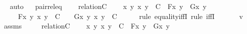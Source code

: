 \begin{isabellebody}
\isadelimproof
\ %
\endisadelimproof
%
\isatagproof
{}\isamarkupfalse%
\ auto%
\endisatagproof
{\isafoldproof}%
%
\isadelimproof
%
\endisadelimproof
\ \isanewline
\isanewline
{}\isamarkupfalse%
\ pair{\isacharunderscore}{\kern0pt}rel{\isacharunderscore}{\kern0pt}eq\ {\isacharcolon}{\kern0pt}\ \isanewline
\ \ {\isachardoublequoteopen}relation{\isacharparenleft}{\kern0pt}C{\isacharparenright}{\kern0pt}\isanewline
\ \ \ {\isasymLongrightarrow}\ {\isacharparenleft}{\kern0pt}{\isasymforall}x{\isachardot}{\kern0pt}\ {\isasymforall}y{\isachardot}{\kern0pt}\ {\isacharless}{\kern0pt}x{\isacharcomma}{\kern0pt}\ y{\isachargreater}{\kern0pt}\ {\isasymin}\ C\ {\isasymlongrightarrow}\ F{\isacharparenleft}{\kern0pt}x{\isacharcomma}{\kern0pt}\ y{\isacharparenright}{\kern0pt}\ {\isacharequal}{\kern0pt}\ G{\isacharparenleft}{\kern0pt}x{\isacharcomma}{\kern0pt}\ y{\isacharparenright}{\kern0pt}{\isacharparenright}{\kern0pt}\ \isanewline
\ \ \ {\isasymLongrightarrow}\ {\isacharbraceleft}{\kern0pt}\ F{\isacharparenleft}{\kern0pt}x{\isacharcomma}{\kern0pt}\ y{\isacharparenright}{\kern0pt}{\isachardot}{\kern0pt}\ {\isacharless}{\kern0pt}x{\isacharcomma}{\kern0pt}\ y{\isachargreater}{\kern0pt}\ {\isasymin}\ C\ {\isacharbraceright}{\kern0pt}\ {\isacharequal}{\kern0pt}\ {\isacharbraceleft}{\kern0pt}\ G{\isacharparenleft}{\kern0pt}x{\isacharcomma}{\kern0pt}\ y{\isacharparenright}{\kern0pt}{\isachardot}{\kern0pt}\ {\isacharless}{\kern0pt}x{\isacharcomma}{\kern0pt}\ y{\isachargreater}{\kern0pt}\ {\isasymin}\ C\ {\isacharbraceright}{\kern0pt}{\isachardoublequoteclose}\ \isanewline
%
\isadelimproof
\ \ %
\endisadelimproof
%
\isatagproof
{}\isamarkupfalse%
\ {\isacharparenleft}{\kern0pt}rule\ equality{\isacharunderscore}{\kern0pt}iffI{\isacharsemicolon}{\kern0pt}\ rule\ iffI{\isacharparenright}{\kern0pt}\isanewline
{}\isamarkupfalse%
\ {\isacharminus}{\kern0pt}\ \isanewline
\ \ \isamarkupfalse%
\ v\ \isamarkupfalse%
\ assms\ {\isacharcolon}{\kern0pt}\isanewline
\ \ \ \ {\isachardoublequoteopen}relation{\isacharparenleft}{\kern0pt}C{\isacharparenright}{\kern0pt}{\isachardoublequoteclose}\isanewline
\ \ \ \ {\isachardoublequoteopen}{\isasymforall}x{\isachardot}{\kern0pt}\ {\isasymforall}y{\isachardot}{\kern0pt}\ {\isacharless}{\kern0pt}x{\isacharcomma}{\kern0pt}\ y{\isachargreater}{\kern0pt}\ {\isasymin}\ C\ {\isasymlongrightarrow}\ F{\isacharparenleft}{\kern0pt}x{\isacharcomma}{\kern0pt}\ y{\isacharparenright}{\kern0pt}\ {\isacharequal}{\kern0pt}\ G{\isacharparenleft}{\kern0pt}x{\isacharcomma}{\kern0pt}\ y{\isacharparenright}{\kern0pt}{\isachardoublequoteclose}\ \isanewline

\end{isabellebody}
